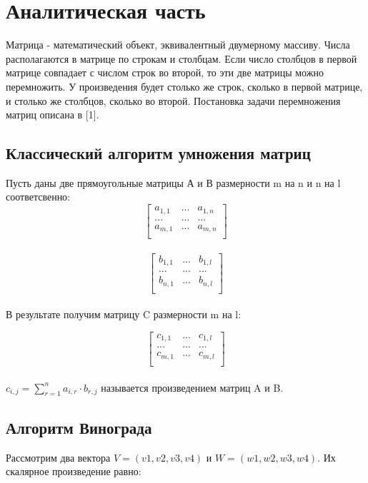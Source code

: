 \documentclass[12pt]{report}
\begin{document}
\chapter{Аналитическая часть}
Матрица - математический объект, эквивалентный двумерному массиву. Числа располагаются в матрице по строкам и столбцам. Если число столбцов в первой матрице совпадает с числом строк во второй, то эти две матрицы можно перемножить. У произведения будет столько же строк, сколько в первой матрице, и столько же столбцов, сколько во второй. Постановка задачи перемножения матриц описана в [1].
	    
\section{Классический алгоритм умножения матриц}
Пусть даны две прямоугольные матрицы А и В размерности m на n и n на l соответсвенно: 
\[ \begin{bmatrix}
a_{1,1} & ... & a_{1,n} \\
... & ... & ... \\
a_{m,1} & ... & a_{m,n} \\
\end{bmatrix} \]\\

\[ \begin{bmatrix}
b_{1,1} & ... & b_{1,l} \\
... & ... & ... \\
b_{n,1} & ... & b_{n,l} \\
\end{bmatrix} \]\\

В результате получим матрицу C размерности m на l:
	
\[ \begin{bmatrix}
c_{1,1} & ... & c_{1,l} \\
... & ... & ... \\
c_{m,1} & ... & c_{m,l} \\
\end{bmatrix} \]\\


$c_{i,j} = \sum\limits_{r=1}^n a_{i,r}\cdot b_{r,j}$ называется произведением матриц A и B.


\section{Алгоритм Винограда}
Рассмотрим два вектора $V = (v1, v2, v3, v4)$ и $W = (w1, w2, w3, w4)$. Их скалярное произведение равно: 
\end{document}
